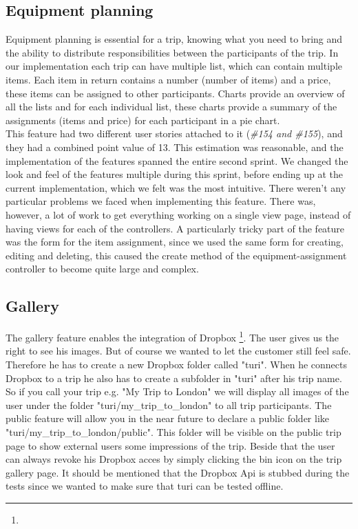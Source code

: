 \documentclass[a4paper]{article}
\begin{document}
\subsection{Equipment planning}
Equipment planning is essential for a trip, knowing what you need to bring and the ability to distribute responsibilities between the participants of the trip. In our implementation each trip can have multiple list, which can contain multiple items. Each item in return contains a number (number of items) and a price, these items can be assigned to other participants. Charts provide an overview of all the lists and for each individual list, these charts provide a summary of the assignments (items and price) for each participant in a pie chart. \\ This feature had two different user stories attached to it (\emph{\#154 and \#155}), and they had a combined point value of 13. This estimation was reasonable, and the implementation of the features spanned the entire second sprint. We changed the look and feel of the features multiple during this sprint, before ending up at the current implementation, which we felt was the most intuitive. There weren't any particular problems we faced when implementing this feature. There was, however, a lot of work to get everything working on a single view page, instead of having views for each of the controllers. A particularly tricky part of the feature was the form for the item assignment, since we used the same form for creating, editing and deleting, this caused the create method of the equipment-assignment controller to become quite large and complex. 

\subsection{Gallery}
The gallery feature enables the integration of Dropbox \footnote{\DROPBOX}. The user gives us the right to see his images. But of course we wanted to let the customer still feel safe. Therefore he has to create a new Dropbox folder called "turi". When he connects Dropbox to a trip he also has to create a subfolder in "turi" after his trip name. So if you call your trip e.g. "My Trip to London" we will display all images of the user under the folder "turi/my\_trip\_to\_london" to all trip participants. The public feature will allow you in the near future to declare a public folder like "turi/my\_trip\_to\_london/public". This folder will be visible on the public trip page to show external users some impressions of the trip. Beside that the user can always revoke his Dropbox acces by simply clicking the bin icon on the trip gallery page. It should be mentioned that the Dropbox Api is stubbed during the tests since we wanted to make sure that turi can be tested offline.
\end{document}
